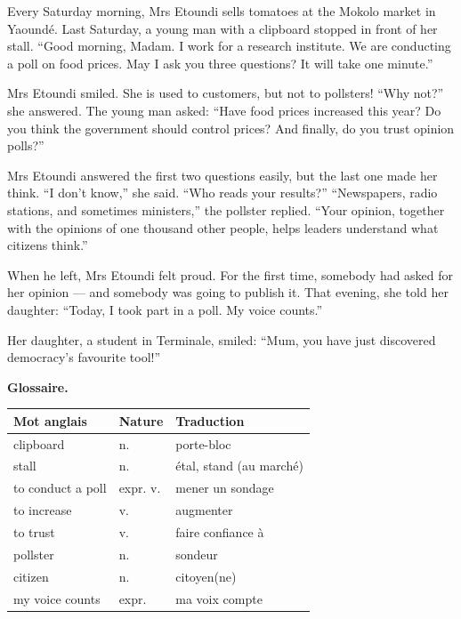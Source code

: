 \documentclass[11pt]{article}
\begin{document}
\begin{textebox}
Every Saturday morning, Mrs Etoundi sells tomatoes at the Mokolo market in Yaoundé. Last Saturday, a young man with a clipboard stopped in front of her stall. “Good morning, Madam. I work for a research institute. We are conducting a poll on food prices. May I ask you three questions? It will take one minute.”

Mrs Etoundi smiled. She is used to customers, but not to pollsters! “Why not?” she answered. The young man asked: “Have food prices increased this year? Do you think the government should control prices? And finally, do you trust opinion polls?”

Mrs Etoundi answered the first two questions easily, but the last one made her think. “I don't know,” she said. “Who reads your results?” “Newspapers, radio stations, and sometimes ministers,” the pollster replied. “Your opinion, together with the opinions of one thousand other people, helps leaders understand what citizens think.”

When he left, Mrs Etoundi felt proud. For the first time, somebody had asked for her opinion — and somebody was going to publish it. That evening, she told her daughter: “Today, I took part in a poll. My voice counts.”

Her daughter, a student in Terminale, smiled: “Mum, you have just discovered democracy's favourite tool!”
\end{textebox}

\textbf{Glossaire.}

\begin{center}
\begin{tabularx}{\linewidth}{|X|X|X|}
\hline
\rowcolor{popblueL} Mot anglais & Nature & Traduction \\
\hline
clipboard & n. & porte-bloc \\
\hline
stall & n. & étal, stand (au marché) \\
\hline
to conduct a poll & expr. v. & mener un sondage \\
\hline
to increase & v. & augmenter \\
\hline
to trust & v. & faire confiance à \\
\hline
pollster & n. & sondeur \\
\hline
citizen & n. & citoyen(ne) \\
\hline
my voice counts & expr. & ma voix compte \\
\hline
\end{tabularx}
\end{center}
\end{document}
